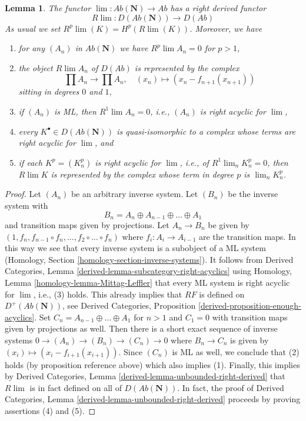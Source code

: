 \documentclass[10pt,a4paper]{amsart}
\theoremstyle{plain}
\newtheorem{lemma}[subsection]{Lemma}
\theoremstyle{definition}
\theoremstyle{remark}
\numberwithin{equation}{subsection}
\def\lim{\mathop{\mathrm{lim}}\nolimits}
\begin{document}
\begin{lemma}
\label{lemma-compute-Rlim}
The functor $\lim : \textit{Ab}(\mathbf{N}) \to \textit{Ab}$
has a right derived functor
\begin{equation}
\label{equation-Rlim}
R\lim : D(\textit{Ab}(\mathbf{N})) \longrightarrow D(\textit{Ab})
\end{equation}
As usual we set $R^p\lim(K) = H^p(R\lim(K))$. Moreover, we have
\begin{enumerate}
\item for any $(A_n)$ in $\textit{Ab}(\mathbf{N})$ we have
$R^p\lim A_n = 0$ for $p > 1$,
\item the object $R\lim A_n$ of $D(\textit{Ab})$ is represented
by the complex
$$
\prod A_n \to \prod A_n,\quad (x_n) \mapsto (x_n - f_{n + 1}(x_{n + 1}))
$$
sitting in degrees $0$ and $1$,
\item if $(A_n)$ is ML, then $R^1\lim A_n = 0$, i.e., $(A_n)$
is right acyclic for $\lim$,
\item every $K^\bullet \in D(\textit{Ab}(\mathbf{N}))$ is quasi-isomorphic
to a complex whose terms are right acyclic for $\lim$, and
\item if each $K^p = (K^p_n)$ is right acyclic for $\lim$, i.e.,
of $R^1\lim_n K^p_n = 0$, then $R\lim K$ is represented by the
complex whose term in degree $p$ is $\lim_n K_n^p$.
\end{enumerate}
\end{lemma}

\begin{proof}
Let $(A_n)$ be an arbitrary inverse system. Let $(B_n)$ be the inverse
system with
$$
B_n = A_n \oplus A_{n - 1} \oplus \ldots \oplus A_1
$$
and transition maps given by projections. Let $A_n \to B_n$ be given
by $(1, f_n, f_{n - 1} \circ f_n, \ldots, f_2 \circ \ldots \circ f_n)$
where $f_i : A_i \to A_{i - 1}$ are the transition maps.
In this way we see that every inverse system is a subobject of a
ML system (Homology, Section \ref{homology-section-inverse-systems}).
It follows from
Derived Categories, Lemma \ref{derived-lemma-subcategory-right-acyclics}
using Homology, Lemma \ref{homology-lemma-Mittag-Leffler}
that every ML system is right acyclic for $\lim$, i.e., (3) holds.
This already implies that $RF$ is defined on $D^+(\textit{Ab}(\mathbf{N}))$,
see Derived Categories, Proposition \ref{derived-proposition-enough-acyclics}.
Set $C_n = A_{n - 1} \oplus \ldots \oplus A_1$ for $n > 1$ and
$C_1 = 0$ with transition maps given by projections as well.
Then there is a short exact sequence of inverse systems
$0 \to (A_n) \to (B_n) \to (C_n) \to 0$ where $B_n \to C_n$
is given by $(x_i) \mapsto (x_i - f_{i + 1}(x_{i + 1}))$.
Since $(C_n)$ is ML as well, we conclude that (2) holds
(by proposition reference above) which also implies (1).
Finally, this implies by Derived Categories, Lemma
\ref{derived-lemma-unbounded-right-derived}
that $R\lim$ is in fact defined on all of $D(\textit{Ab}(\mathbf{N}))$.
In fact, the proof of Derived Categories, Lemma
\ref{derived-lemma-unbounded-right-derived}
proceeds by proving assertions (4) and (5).
\end{proof}
\end{document}
